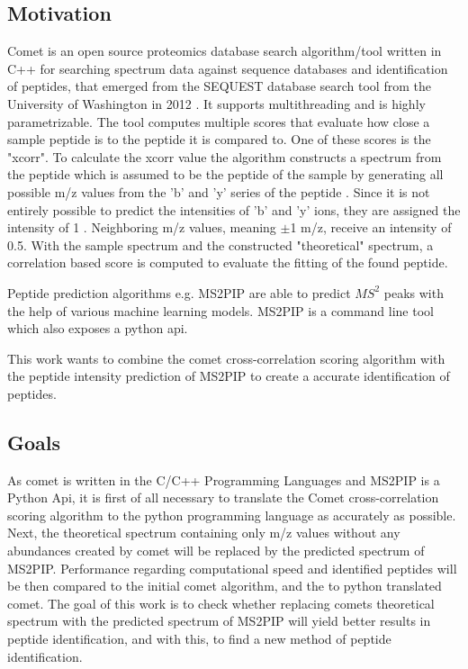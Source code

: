 \documentclass[12pt]{article}
\begin{document}
\subsection{Motivation}
Comet is an open source proteomics database search algorithm/tool written in C++ for searching spectrum data against sequence databases and identification of peptides, that emerged from the SEQUEST database search tool from the University of Washington in 2012 \cite{comet-search-tool}. It supports multithreading and is highly parametrizable. The tool computes multiple scores that evaluate how close a sample peptide is to the peptide it is compared to. One of these scores is the "xcorr". To calculate the xcorr value the algorithm constructs a spectrum from the peptide which is assumed to be the peptide of the sample by generating all possible m/z values from the 'b' and 'y' series of the peptide \cite{comet-first-paper}.  Since it is not entirely possible to predict the intensities of 'b' and 'y' ions, they are assigned the intensity of 1 \cite{deeper-look-into-comet}. Neighboring m/z values, meaning $\pm$1 m/z, receive an intensity of 0.5. With the sample spectrum and the constructed "theoretical" spectrum, a correlation based score is computed
to evaluate the fitting of the found peptide.

Peptide prediction algorithms e.g. MS2PIP\cite{ms2pip} are able to predict \(MS^2\) peaks with the help of various machine learning models.
MS2PIP is a command line tool which also exposes a python api.

This work wants to combine the comet cross-correlation scoring algorithm
with the peptide intensity prediction of MS2PIP to create a accurate identification of peptides.


\subsection{Goals}
As comet is written in the C/C++ Programming Languages and MS2PIP is a Python Api, it is first of all necessary to translate the Comet cross-correlation scoring algorithm to the python programming language as accurately as possible. Next, the theoretical spectrum containing only m/z values without any abundances created by comet will be replaced by the predicted spectrum of MS2PIP. Performance regarding computational speed and identified peptides will be then compared to the initial comet algorithm, and the to python translated comet.
The goal of this work is to check whether replacing comets theoretical spectrum with the predicted spectrum of MS2PIP will yield better results in peptide identification, and with this, to find a new method of peptide identification.
\end{document}
